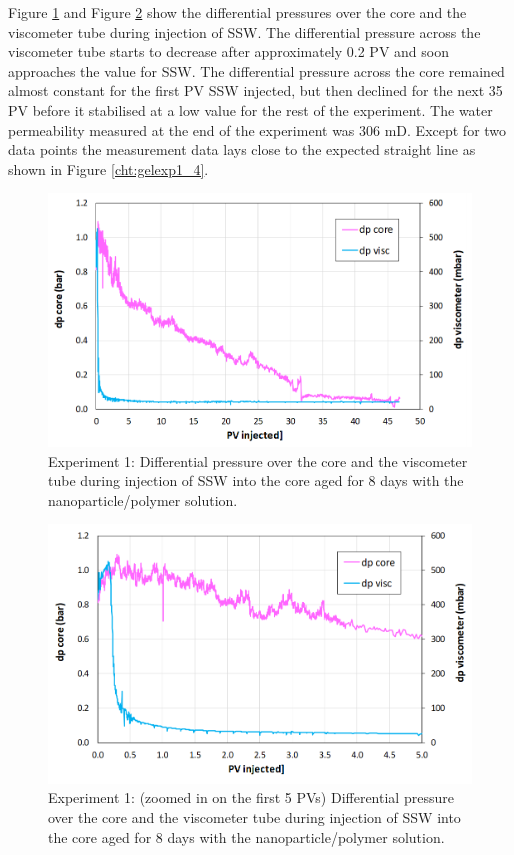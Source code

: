 Figure \ref{cht:gelexp1_2} and Figure \ref{cht:gelexp1_3} show the differential pressures over the core and the viscometer tube during injection of SSW. The differential pressure across the viscometer tube starts to decrease after approximately 0.2 PV and soon approaches the value for SSW. The differential pressure across the core remained almost constant for the first PV SSW injected, but then declined for the next 35 PV before it stabilised at a low value for the rest of the experiment. The water permeability measured at the end of the experiment was 306 mD. Except for two data points the measurement data lays close to the expected straight line as shown in Figure \ref{cht:gelexp1_4}.

\begin{figure}[h!]
    \centering
    \includegraphics[width=\textwidth]{img/cht/gelexp1_2.png}
    \caption{Experiment 1: Differential pressure over the core and the viscometer tube during injection of SSW into the core aged for 8 days with the nanoparticle/polymer solution.}
    \label{cht:gelexp1_2} %
\end{figure}

\begin{figure}[h!]
    \centering
    \includegraphics[width=\textwidth]{img/cht/gelexp1_3.png}
    \caption{Experiment 1: (zoomed in on the first 5 PVs) Differential pressure over the core and the viscometer tube during injection of SSW into the core aged for 8 days with the nanoparticle/polymer solution.}
    \label{cht:gelexp1_3} %
\end{figure}

